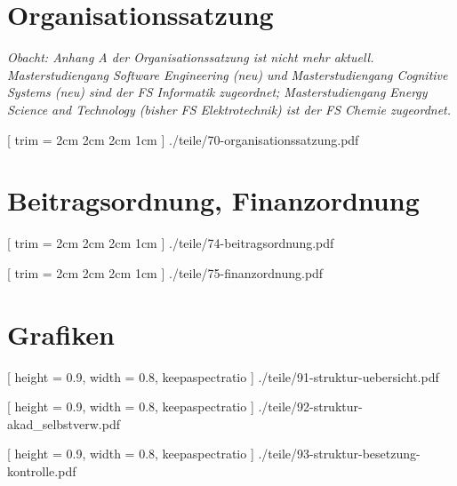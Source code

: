 \documentclass[
	10pt,
	a5paper,
	twoside
	]
	{book}
\begin{document}
\chapter{Organisationssatzung}

\textit{Obacht: Anhang A der Organisationssatzung ist nicht mehr aktuell. Masterstudiengang Software Engineering (neu) und Masterstudiengang Cognitive Systems (neu) sind der FS Informatik zugeordnet; Masterstudiengang Energy Science and Technology (bisher FS Elektrotechnik) ist der FS Chemie zugeordnet.}

\clearpage


	[
		trim = 2cm 2cm 2cm 1cm
	]
	{./teile/70-organisationssatzung.pdf}


\chapter{Beitragsordnung, Finanzordnung}


\clearpage


[
trim = 2cm 2cm 2cm 1cm
]
{./teile/74-beitragsordnung.pdf}


	[
		trim = 2cm 2cm 2cm 1cm
	]
	{./teile/75-finanzordnung.pdf}


\chapter{Grafiken}

\clearpage



	[
		height = 0.9\paperheight,
		width = 0.8\paperwidth,
		keepaspectratio
	]
	{./teile/91-struktur-uebersicht.pdf}




	[
		height = 0.9\paperheight,
		width = 0.8\paperwidth,
		keepaspectratio
	]
	{./teile/92-struktur-akad_selbstverw.pdf}




	[
		height = 0.9\paperheight,
		width = 0.8\paperwidth,
		keepaspectratio
	]
	{./teile/93-struktur-besetzung-kontrolle.pdf}



\backmatter


\end{document}
